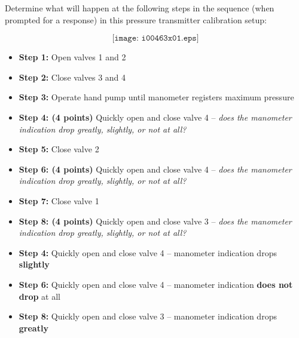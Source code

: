 

Determine what will happen at the following steps in the sequence (when prompted for a response) in this pressure transmitter calibration setup:

$$\texttt{[image: i00463x01.eps]}$$

\begin{itemize}
\item{} {\bf Step 1:} Open valves 1 and 2
\vskip 5pt
\item{} {\bf Step 2:} Close valves 3 and 4
\vskip 5pt
\item{} {\bf Step 3:} Operate hand pump until manometer registers maximum pressure
\vskip 5pt
\item{} {\bf Step 4: (4 points)} Quickly open and close valve 4 -- {\it does the manometer indication drop greatly, slightly, or not at all?}
\vskip 5pt
\item{} {\bf Step 5:} Close valve 2
\vskip 5pt
\item{} {\bf Step 6: (4 points)} Quickly open and close valve 4 -- {\it does the manometer indication drop greatly, slightly, or not at all?}
\vskip 5pt
\item{} {\bf Step 7:} Close valve 1
\vskip 5pt
\item{} {\bf Step 8: (4 points)} Quickly open and close valve 3 -- {\it does the manometer indication drop greatly, slightly, or not at all?}
\end{itemize}







\begin{itemize}
\item{} {\bf Step 4:} Quickly open and close valve 4 -- manometer indication drops {\bf slightly}
\item{} {\bf Step 6:} Quickly open and close valve 4 -- manometer indication {\bf does not drop} at all
\item{} {\bf Step 8:} Quickly open and close valve 3 -- manometer indication drops {\bf greatly}
\end{itemize}






